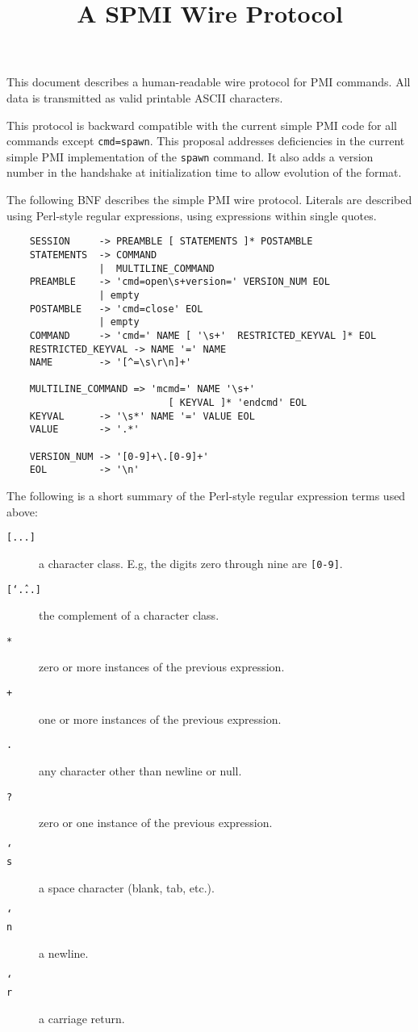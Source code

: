 \documentclass{article}
\title{A SPMI Wire Protocol}
\begin{document}
%
%
%
This document describes a human-readable wire protocol for PMI
commands.  All data is transmitted as valid printable ASCII
characters.

This protocol is backward compatible with the current simple PMI code
for all commands except \texttt{cmd=spawn}.   This proposal addresses
deficiencies in the current simple PMI implementation of the
\texttt{spawn} command.  It also adds a version number in the
handshake at initialization time to allow evolution of the format.

The following BNF describes the simple PMI wire protocol.  Literals are 
described using Perl-style regular expressions, using expressions within single
quotes.
\begin{verbatim}
    SESSION     -> PREAMBLE [ STATEMENTS ]* POSTAMBLE
    STATEMENTS  -> COMMAND
                |  MULTILINE_COMMAND
    PREAMBLE    -> 'cmd=open\s+version=' VERSION_NUM EOL
                | empty
    POSTAMBLE   -> 'cmd=close' EOL
                | empty
    COMMAND     -> 'cmd=' NAME [ '\s+'  RESTRICTED_KEYVAL ]* EOL
    RESTRICTED_KEYVAL -> NAME '=' NAME
    NAME        -> '[^=\s\r\n]+'
    
    MULTILINE_COMMAND => 'mcmd=' NAME '\s+' 
                            [ KEYVAL ]* 'endcmd' EOL
    KEYVAL      -> '\s*' NAME '=' VALUE EOL
    VALUE       -> '.*'

    VERSION_NUM -> '[0-9]+\.[0-9]+'
    EOL         -> '\n'
\end{verbatim}
The following is a short summary of the Perl-style regular expression
terms used above:
\begin{description}
\item[\texttt{[...]}]a character class.  E.g, the digits zero through
 nine are \texttt{[0-9]}.
\item[\texttt{[\char`\^...]}]the complement of a character class.
\item[\texttt{*}]zero or more instances of the previous expression.
\item[\texttt{+}]one or more instances of the previous expression.
\item[\texttt{.}]any character other than newline or null.
\item[\texttt{?}]zero or one instance of the previous expression.
\item[\texttt{\char`\\s}]a space character (blank, tab, etc.).
\item[\texttt{\char`\\n}]a newline.
\item[\texttt{\char`\\r}]a carriage return.
\end{description}
\end{document}
